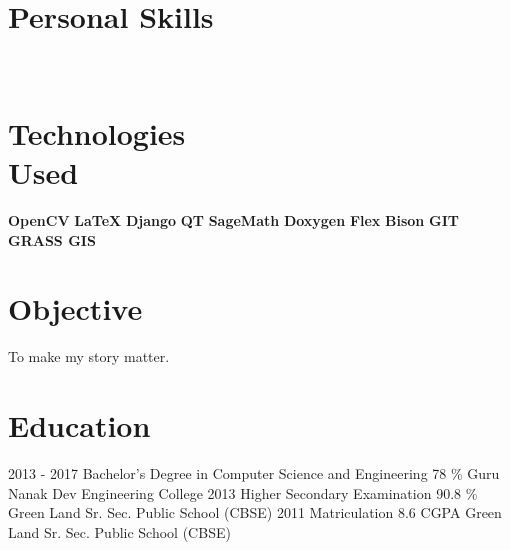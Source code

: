 \documentclass[]{friggeri-cv}
\begin{document}
\begin{aside}
  \section{Personal Skills}
    ~
  \section{Technologies \\ Used}
        \textbf{OpenCV}
        \textbf{LaTeX}
        \textbf{Django}
        \textbf{QT}
        \textbf{SageMath}
        \textbf{Doxygen}
        \textbf{Flex}
        \textbf{Bison}
        \textbf{GIT}
        \textbf{GRASS GIS} 
     ~      
\end{aside}

\section{Objective}
To make my story matter.
\section{Education}
\begin{entrylist}
  \entry
    {2013 - 2017}
    {Bachelor's Degree in Computer Science and Engineering}
    {78 \%}
    {Guru Nanak Dev Engineering College}
  \entry
    {2013}
    {Higher Secondary Examination}
    {90.8 \%}
    {Green Land Sr. Sec. Public School (CBSE)}
    \entry
    {2011}
    {Matriculation}
    {8.6 CGPA}
    {Green Land Sr. Sec. Public School (CBSE) }
\end{entrylist}
\end{document}
